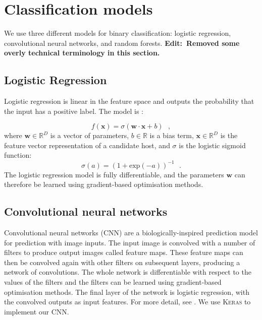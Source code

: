\documentclass[fleqn,usenatbib,usedcolumn]{mnras}
\renewcommand{\vec}[1]{\mathbf{#1}}
\newcommand{\edit}[1]{{\bf Edit:~{#1}}}
\begin{document}
\appendix

\section{Classification models}\label{app:models}

  We use three different models for binary classification: logistic regression, convolutional neural networks, and random forests. \edit{Removed some overly technical terminology in this section.}

  \subsection{Logistic Regression}
  \label{sec:logistic-regression}
    Logistic regression is linear in the feature space and outputs the probability that the input has a positive label. The model is \citep{bishop06ml}:

    \begin{equation}
        f(\vec x) = \sigma(\vec w \cdot \vec x + b) \,\,\,\,,
    \end{equation}
    where $\vec w \in \mathbb{R}^D$ is a vector of parameters, $b \in \mathbb{R}$ is a bias term, $\vec x \in \mathbb{R}^D$ is the feature vector representation of a candidate host, and $\sigma$ is the logistic sigmoid function: \begin{equation}
        \sigma(a) = (1 + \mathrm{exp}(-a))^{-1}\,\,\,\,.
    \end{equation}%
    The logistic regression model is fully differentiable, and the parameters $\vec w$ can therefore be learned using gradient-based optimisation methods.

  \subsection{Convolutional neural networks}
  \label{sec:convolutional-neural-networks}

    Convolutional neural networks (CNN) are a biologically-inspired prediction model for prediction with image inputs. The input image is convolved with a number of filters to produce output images called feature maps. These feature maps can then be convolved again with other filters on subsequent layers, producing a network of convolutions. The whole network is differentiable with respect to the values of the filters and the filters can be learned using gradient-based optimisation methods. The final layer of the network is logistic regression, with the convolved outputs as input features. For more detail, see \citet[subsection II.A][]{lecun98}. We use \textsc{Keras} \citep{chollet15keras} to implement our CNN.
\end{document}
